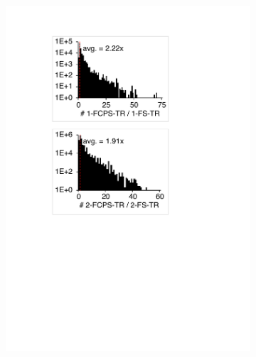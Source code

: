 \begin{figure}
\begin{subfigure}{0.24\textwidth}
    \includegraphics[width=\textwidth]{img/1-fcps-hist}
  \end{subfigure}
  \begin{subfigure}{0.24\textwidth}
    \centering

\end{subfigure}
\end{figure}
